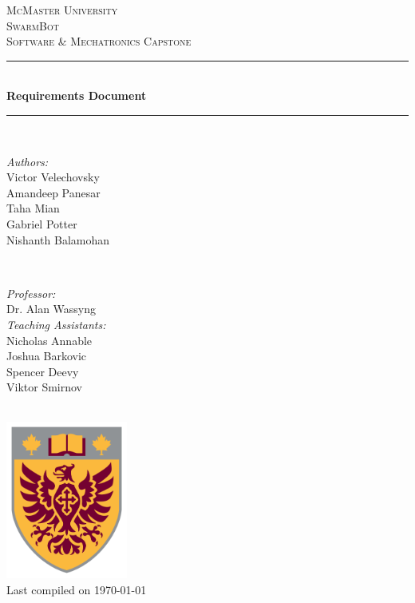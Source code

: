 \documentclass[11pt]{article}
\begin{document}
\newcommand{\PROJECTNAME}{SwarmBot}

\begin{titlepage}
	\newcommand{\HRule}{\rule{\linewidth}{0.2mm}}
	\begin{center}
	\textsc{\LARGE McMaster University}\\[1.5cm]
	
	\textsc{\Large \PROJECTNAME}\\[0.5cm]
	\textsc{\large Software \& Mechatronics Capstone}\\[0.5cm] 

	\HRule\\[0.4cm]
		{\huge\bfseries Requirements Document}\\[0.4cm]
	\HRule\\[0.4cm]
	
	\begin{minipage}[t][][t]{0.5\textwidth}
		\begin{flushleft} \large
			\emph{Authors:}\\
			Victor Velechovsky \\
			Amandeep Panesar \\
			Taha Mian \\
			Gabriel Potter \\
			Nishanth Balamohan \\
		\end{flushleft}
	\end{minipage}
	~
	\begin{minipage}[t][][t]{0.4\textwidth}
		\begin{flushright} \large
			\emph{Professor:} \\
			Dr. Alan Wassyng \\[0.4cm]
			\emph{Teaching Assistants:} \\
			Nicholas Annable \\
			Joshua Barkovic \\
			Spencer Deevy \\
			Viktor Smirnov
		\end{flushright}
	\end{minipage}\\[2cm]
	
	\includegraphics[width=0.3\textwidth]{images/logo.png} \\
	{\large Last compiled on \today}
	\end{center}

\end{titlepage}
\end{document}
